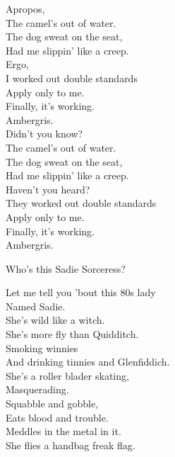 Apropos, \\
The camel's out of water. \\
The dog sweat on the seat, \\
Had me slippin' like a creep. \\

Ergo, \\
I worked out double standards \\
Apply only to me. \\
Finally, it's working. \\
Ambergris. \\

Didn't you know? \\
The camel's out of water. \\
The dog sweat on the seat, \\
Had me slippin' like a creep. \\

Haven't you heard? \\
They worked out double standards \\
Apply only to me. \\
Finally, it's working. \\
Ambergris. \\





Who's this Sadie Sorceress? \\


Let me tell you 'bout this 80s lady \\
Named Sadie. \\
She's wild like a witch. \\
She's more fly than Quidditch. \\
Smoking winnies \\
And drinking tinnies and Glenfiddich. \\
She's a roller blader skating, \\
Masquerading. \\
Squabble and gobble, \\
Eats blood and trouble. \\
Meddles in the metal in it. \\
She flies a handbag freak flag. \\

